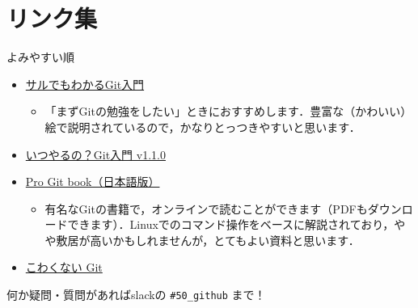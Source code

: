 \documentclass[12pt,dvipdfmx,svgnames,uplatex,aspectratio=169]{beamer}
\begin{document}
\section{リンク集}
\begin{frame}{\insertsection}
  \begin{block}{よみやすい順}
    \begin{itemize}
      \item \href{https://backlog.com/ja/git-tutorial/}{サルでもわかるGit入門}
      \begin{itemize}
        \item 「まずGitの勉強をしたい」ときにおすすめします．豊富な（かわいい）絵で説明されているので，かなりとっつきやすいと思います．
      \end{itemize}
      \item \href{https://www.slideshare.net/matsukaz/git-28304397}{いつやるの？Git入門 v1.1.0}
      \item \href{https://git-scm.com/book/ja/v2}{Pro Git book（日本語版）}
      \begin{itemize}
        \item 有名なGitの書籍で，オンラインで読むことができます（PDFもダウンロードできます）．Linuxでのコマンド操作をベースに解説されており，やや敷居が高いかもしれませんが，とてもよい資料と思います．
      \end{itemize}
      \item \href{https://www.slideshare.net/kotas/git-15276118}{こわくない Git}
    \end{itemize}
  \end{block}
  何か疑問・質問があればslackの \texttt{\#50\_github} まで！
\end{frame}
\end{document}

